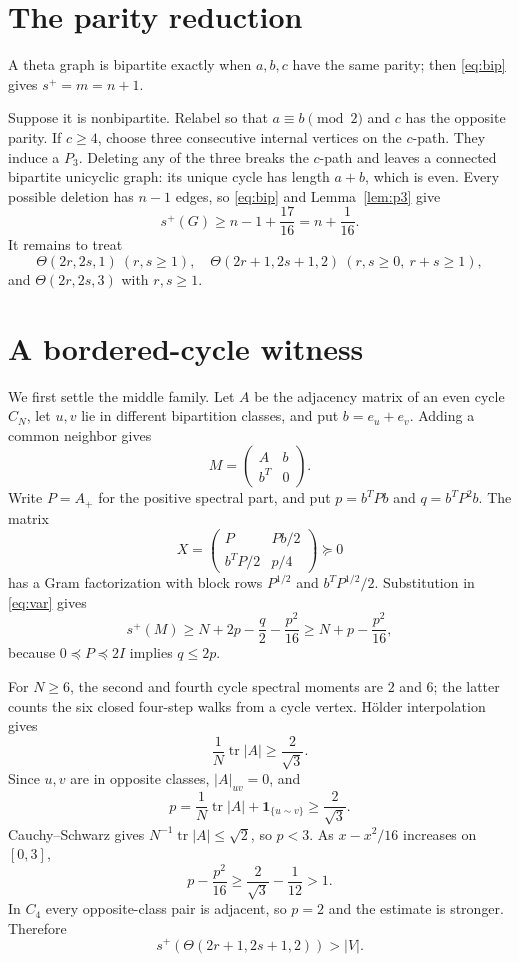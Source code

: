\documentclass[11pt]{article}
\begin{document}
\section{The parity reduction}
A theta graph is bipartite exactly when $a,b,c$ have the same parity; then
\eqref{eq:bip} gives $s^+=m=n+1$.

Suppose it is nonbipartite.  Relabel so that $a\equiv b\pmod2$ and $c$ has the
opposite parity.  If $c\ge4$, choose three consecutive internal vertices on
the $c$-path.  They induce a $P_3$.  Deleting any of the three breaks the
$c$-path and leaves a connected bipartite unicyclic graph: its unique cycle
has length $a+b$, which is even.  Every possible deletion has $n-1$ edges, so
\eqref{eq:bip} and Lemma~\ref{lem:p3} give
\begin{equation}\label{eq:long}
 s^+(G)\ge n-1+\frac{17}{16}=n+\frac1{16}.
\end{equation}
It remains to treat
\[
 \Theta(2r,2s,1)\ (r,s\ge1),\quad
 \Theta(2r+1,2s+1,2)\ (r,s\ge0,\ r+s\ge1),
\]
and $\Theta(2r,2s,3)$ with $r,s\ge1$.

\section{A bordered-cycle witness}
We first settle the middle family.  Let $A$ be the adjacency matrix of an
even cycle $C_N$, let $u,v$ lie in different bipartition classes, and put
$b=e_u+e_v$.  Adding a common neighbor gives
\[
 M=\begin{pmatrix}A&b\\b^T&0\end{pmatrix}.
\]
Write $P=A_+$ for the positive spectral part, and put $p=b^TPb$ and
$q=b^TP^2b$.  The matrix
\[
 X=\begin{pmatrix}P&Pb/2\\b^TP/2&p/4\end{pmatrix}\succeq0
\]
has a Gram factorization with block rows $P^{1/2}$ and
$b^TP^{1/2}/2$.  Substitution in \eqref{eq:var} gives
\[
 s^+(M)\ge N+2p-\frac q2-\frac{p^2}{16}
 \ge N+p-\frac{p^2}{16},
\]
because $0\preceq P\preceq2I$ implies $q\le2p$.

For $N\ge6$, the second and fourth cycle spectral moments are $2$ and $6$;
the latter counts the six closed four-step walks from a cycle vertex.
H\"older interpolation gives
\[
 \frac1N\operatorname{tr}|A|\ge\frac2{\sqrt3}.
\]
Since $u,v$ are in opposite classes, $|A|_{uv}=0$, and
\[
p=\frac1N\operatorname{tr}|A|+\mathbf1_{\{u\sim v\}}\ge\frac2{\sqrt3}.
\]
Cauchy--Schwarz gives $N^{-1}\operatorname{tr}|A|\le\sqrt2$, so $p<3$.
As $x-x^2/16$ increases on $[0,3]$,
\[
 p-\frac{p^2}{16}\ge\frac2{\sqrt3}-\frac1{12}>1.
\]
In $C_4$ every opposite-class pair is adjacent, so $p=2$ and the estimate is
stronger.  Therefore
\begin{equation}\label{eq:oddodd2}
 s^+(\Theta(2r+1,2s+1,2))>|V|.
\end{equation}
\end{document}
